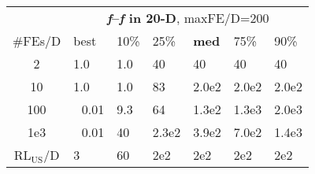 \begin{tabular}{c|llllll}
 & \multicolumn{6}{|c}{\textbf{\textit{f}\raisebox{-0.35ex}{1}--\textit{f}\raisebox{-0.35ex}{24} in 20-D}, maxFE/D=200}\\
\#FEs/D & best & 10\% & 25\% & \textbf{med} & 75\% & 90\%\\
2 & \hspace*{1ex}1.0 & \hspace*{1ex}1.0 & 40 & 40 & 40 & 40\\
10 & \hspace*{1ex}1.0 & \hspace*{1ex}1.0 & 83 & 2.0e2 & 2.0e2 & 2.0e2\\
100 & ~\,0.01 & \hspace*{1ex}9.3 & 64 & 1.3e2 & 1.3e3 & 2.0e3\\
1e3 & ~\,0.01 & 40 & 2.3e2 & 3.9e2 & 7.0e2 & 1.4e3\\
$\text{RL}_{\text{US}}$/D & 3 & 60 & 2e2 & 2e2 & 2e2 & 2e2
\end{tabular}
